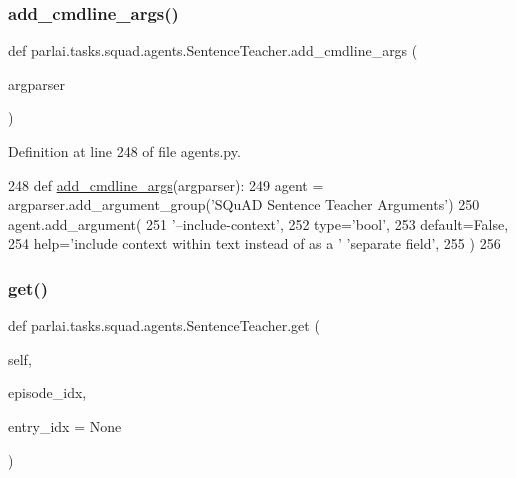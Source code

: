 \subsubsection{\texorpdfstring{add\+\_\+cmdline\+\_\+args()}{add\_cmdline\_args()}}
{\footnotesize\ttfamily def parlai.\+tasks.\+squad.\+agents.\+Sentence\+Teacher.\+add\+\_\+cmdline\+\_\+args (\begin{DoxyParamCaption}\item[{}]{argparser }\end{DoxyParamCaption})\hspace{0.3cm}{\ttfamily [static]}}



Definition at line 248 of file agents.\+py.


\begin{DoxyCode}
248     \textcolor{keyword}{def }\hyperlink{namespaceparlai_1_1agents_1_1drqa_1_1config_a62fdd5554f1da6be0cba185271058320}{add\_cmdline\_args}(argparser):
249         agent = argparser.add\_argument\_group(\textcolor{stringliteral}{'SQuAD Sentence Teacher Arguments'})
250         agent.add\_argument(
251             \textcolor{stringliteral}{'--include-context'},
252             type=\textcolor{stringliteral}{'bool'},
253             default=\textcolor{keyword}{False},
254             help=\textcolor{stringliteral}{'include context within text instead of as a '} \textcolor{stringliteral}{'separate field'},
255         )
256 
\end{DoxyCode}
\mbox{\label{classparlai_1_1tasks_1_1squad_1_1agents_1_1SentenceTeacher_a940eaa197e21e8237fc459e55d68d61f}} 
\subsubsection{\texorpdfstring{get()}{get()}}
{\footnotesize\ttfamily def parlai.\+tasks.\+squad.\+agents.\+Sentence\+Teacher.\+get (\begin{DoxyParamCaption}\item[{}]{self,  }\item[{}]{episode\+\_\+idx,  }\item[{}]{entry\+\_\+idx = {\ttfamily None} }\end{DoxyParamCaption})}



